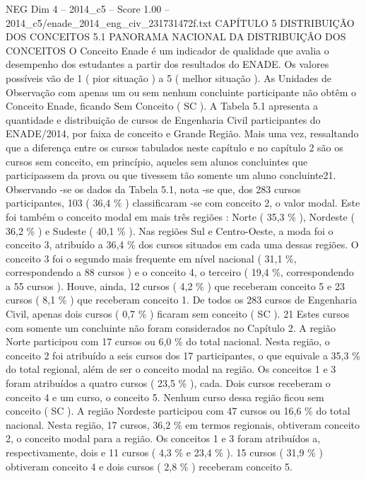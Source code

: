 \begin{textsample}{NEG Dim 4 – 2014\_c5 – Score 1.00 – 2014\_c5/enade\_2014\_eng\_civ\_231731472f.txt}  \label{ex:f4_neg_208}
CAPÍTULO 5 DISTRIBUIÇÃO DOS CONCEITOS 5.1 PANORAMA NACIONAL DA DISTRIBUIÇÃO DOS CONCEITOS O Conceito Enade é um indicador de qualidade que avalia o desempenho dos estudantes a partir dos resultados do ENADE.
Os valores possíveis vão de 1 ( pior situação ) a 5 ( melhor situação ).
As Unidades de Observação com apenas um ou sem nenhum concluinte participante não obtêm o Conceito Enade, ficando Sem Conceito ( SC ).
A Tabela 5.1 apresenta a quantidade e distribuição de cursos de Engenharia Civil participantes do ENADE/2014, por faixa de conceito e Grande Região.
Mais uma vez, ressaltando que a diferença entre os cursos tabulados neste capítulo e no capítulo 2 são os cursos sem conceito, em princípio, aqueles sem alunos concluintes que participassem da prova ou que tivessem tão somente um aluno concluinte21.
Observando -se os dados da Tabela 5.1, nota -se que, dos 283 cursos participantes, 103 ( 36,4 \% ) classificaram -se com conceito 2, o valor modal.
Este foi também o conceito modal em mais três regiões : Norte ( 35,3 \% ), Nordeste ( 36,2 \% ) e Sudeste ( 40,1 \% ).
Nas regiões Sul e Centro-Oeste, a moda foi o conceito 3, atribuído a 36,4 \% dos cursos situados em cada uma dessas regiões.
O conceito 3 foi o segundo mais frequente em nível nacional ( 31,1 \%, correspondendo a 88 cursos ) e o conceito 4, o terceiro ( 19,4 \%, correspondendo a 55 cursos ).
Houve, ainda, 12 cursos ( 4,2 \% ) que receberam conceito 5 e 23 cursos ( 8,1 \% ) que receberam conceito 1.
De todos os 283 cursos de Engenharia Civil, apenas dois cursos ( 0,7 \% ) ficaram sem conceito ( SC ). 21 Estes cursos com somente um concluinte não foram considerados no Capítulo 2.
A região Norte participou com 17 cursos ou 6,0 \% do total nacional.
Nesta região, o conceito 2 foi atribuído a seis cursos dos 17 participantes, o que equivale a 35,3 \% do total regional, além de ser o conceito modal na região.
Os conceitos 1 e 3 foram atribuídos a quatro cursos ( 23,5 \% ), cada.
Dois cursos receberam o conceito 4 e um curso, o conceito 5.
Nenhum curso dessa região ficou sem conceito ( SC ).
A região Nordeste participou com 47 cursos ou 16,6 \% do total nacional.
Nesta região, 17 cursos, 36,2 \% em termos regionais, obtiveram conceito 2, o conceito modal para a região.
Os conceitos 1 e 3 foram atribuídos a, respectivamente, dois e 11 cursos ( 4,3 \% e 23,4 \% ). 15 cursos ( 31,9 \% ) obtiveram conceito 4 e dois cursos ( 2,8 \% ) receberam conceito 5.

\end{textsample}
